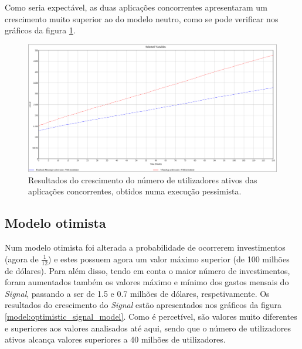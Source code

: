 Como seria expectável, as duas aplicações concorrentes apresentaram um crescimento muito superior ao do modelo neutro, como se pode verificar nos gráficos da figura \ref{model:pessimist_others_model}.

\begin{figure}[H]
   \begin{center}
       \includegraphics[width=17cm]{img/pessimist_model_others.png}
       \caption{Resultados do crescimento do número de utilizadores ativos das aplicações concorrentes, obtidos numa execução pessimista.}
       \label{model:pessimist_others_model}
   \end{center}
\end{figure}


\subsection{Modelo otimista}

Num modelo otimista foi alterada a probabilidade de ocorrerem investimentos (agora de $\frac{1}{12}$) e estes possuem agora um valor máximo superior (de 100 milhões de dólares). Para além disso, tendo em conta o maior número de investimentos, foram aumentados também os valores máximo e mínimo dos gastos mensais do \textit{Signal}, passando a ser de 1.5 e 0.7 milhões de dólares, respetivamente. Os resultados do crescimento do \textit{Signal} estão apresentados nos gráficos da figura \ref{model:optimistic_signal_model}. Como é percetível, são valores muito diferentes e superiores aos valores analisados até aqui, sendo que o número de utilizadores ativos alcança valores superiores a 40 milhões de utilizadores.

